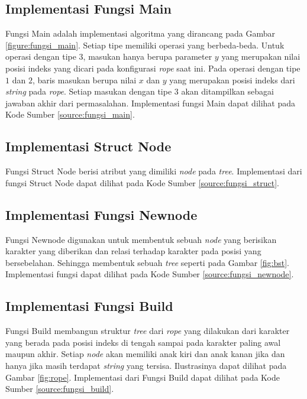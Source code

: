 \subsection{Implementasi Fungsi Main}
Fungsi Main adalah implementasi algoritma yang dirancang pada Gambar \ref{figure:fungsi_main}. Setiap tipe memiliki operasi yang berbeda-beda. Untuk operasi dengan tipe $3$, masukan hanya berupa parameter $y$ yang merupakan nilai posisi indeks yang dicari pada konfigurasi \textit{rope} saat ini. Pada operasi dengan tipe $1$ dan $2$, baris masukan berupa nilai $x$ dan $y$ yang merupakan posisi indeks dari \textit{string} pada \textit{rope}. Setiap masukan dengan tipe $3$ akan ditampilkan sebagai jawaban akhir dari permasalahan. Implementasi fungsi Main dapat dilihat pada Kode Sumber \ref{source:fungsi_main}.



\subsection{Implementasi Struct Node}
Fungsi Struct Node berisi atribut yang dimiliki \textit{node} pada \textit{tree}. Implementasi dari fungsi Struct Node dapat dilihat pada Kode Sumber \ref{source:fungsi_struct}.



\subsection{Implementasi Fungsi Newnode}
Fungsi Newnode digunakan untuk membentuk sebuah \textit{node} yang berisikan karakter yang diberikan dan relasi terhadap karakter pada posisi yang bersebelahan. Sehingga membentuk sebuah \textit{tree} seperti pada Gambar \ref{fig:bst}. Implementasi fungsi  dapat dilihat pada Kode Sumber \ref{source:fungsi_newnode}.



\subsection{Implementasi Fungsi Build}
Fungsi Build membangun struktur \textit{tree} dari \textit{rope} yang dilakukan dari karakter yang berada pada posisi indeks di tengah sampai pada karakter paling awal maupun akhir.  Setiap \textit{node} akan memiliki anak kiri dan anak kanan jika dan hanya jika masih terdapat \textit{string} yang tersisa. Ilustrasinya dapat dilihat pada Gambar \ref{fig:rope}. Implementasi dari Fungsi Build dapat dilihat pada Kode Sumber \ref{source:fungsi_build}.


